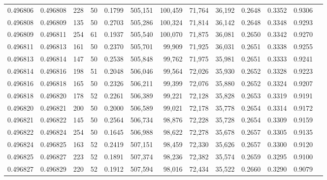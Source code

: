 \begin{tabular}{rrrrrrrrrrrrr}
0.496806 & 0.496808 &   228 &  50 &                                     0.1799 & 505,151 & 100,459 &  71,764 &  36,192 & 0.2648 & 0.3352 & 0.9306 \\
0.496808 & 0.496809 &   135 &  50 &                                     0.2703 & 505,286 & 100,324 &  71,814 &  36,142 & 0.2648 & 0.3348 & 0.9293 \\
0.496809 & 0.496811 &   254 &  61 &                                     0.1937 & 505,540 & 100,070 &  71,875 &  36,081 & 0.2650 & 0.3342 & 0.9270 \\
0.496811 & 0.496813 &   161 &  50 &                                     0.2370 & 505,701 &  99,909 &  71,925 &  36,031 & 0.2651 & 0.3338 & 0.9255 \\
0.496813 & 0.496814 &   147 &  50 &                                     0.2538 & 505,848 &  99,762 &  71,975 &  35,981 & 0.2651 & 0.3333 & 0.9241 \\
0.496814 & 0.496816 &   198 &  51 &                                     0.2048 & 506,046 &  99,564 &  72,026 &  35,930 & 0.2652 & 0.3328 & 0.9223 \\
0.496816 & 0.496818 &   165 &  50 &                                     0.2326 & 506,211 &  99,399 &  72,076 &  35,880 & 0.2652 & 0.3324 & 0.9207 \\
0.496818 & 0.496820 &   178 &  52 &                                     0.2261 & 506,389 &  99,221 &  72,128 &  35,828 & 0.2653 & 0.3319 & 0.9191 \\
0.496820 & 0.496821 &   200 &  50 &                                     0.2000 & 506,589 &  99,021 &  72,178 &  35,778 & 0.2654 & 0.3314 & 0.9172 \\
0.496821 & 0.496822 &   145 &  50 &                                     0.2564 & 506,734 &  98,876 &  72,228 &  35,728 & 0.2654 & 0.3309 & 0.9159 \\
0.496822 & 0.496824 &   254 &  50 &                                     0.1645 & 506,988 &  98,622 &  72,278 &  35,678 & 0.2657 & 0.3305 & 0.9135 \\
0.496824 & 0.496825 &   163 &  52 &                                     0.2419 & 507,151 &  98,459 &  72,330 &  35,626 & 0.2657 & 0.3300 & 0.9120 \\
0.496825 & 0.496827 &   223 &  52 &                                     0.1891 & 507,374 &  98,236 &  72,382 &  35,574 & 0.2659 & 0.3295 & 0.9100 \\
0.496827 & 0.496829 &   220 &  52 &                                     0.1912 & 507,594 &  98,016 &  72,434 &  35,522 & 0.2660 & 0.3290 & 0.9079 \\

\end{tabular}
